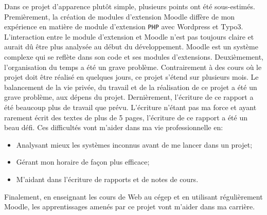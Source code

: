 \begin{conclusion}
Dans ce projet d'apparence plut\^ot simple, plusieurs points ont \'et\'e sous-estim\'es.
Premi\`erement, la cr\'eation de modules d'extension Moodle diff\`ere de mon exp\'erience en mati\`ere de module d'extension \texttt{PHP} avec Wordpress et Typo3.
L'interaction entre le module d'extension et Moodle n'est pas toujours claire et aurait d\^u \^etre plus analys\'ee au d\'ebut du d\'eveloppement.
Moodle est un syst\`eme complexe qui se refl\`ete dans son code et ses modules d'extensions.
Deuxi\`emement, l'organisation du temps a \'et\'e un grave probl\`eme.
Contrairement \`a des cours o\`u le projet doit \^etre r\'ealis\'e en quelques jours, ce projet s'\'etend sur plusieurs mois.
Le balancement de la vie priv\'ee, du travail et de la r\'ealisation de ce projet a \'et\'e un grave probl\`eme, aux d\'epens du projet.
Derni\`erement, l'\'ecriture de ce rapport a \'et\'e beaucoup plus de travail que pr\'evu.
L'\'ecriture n'\'etant pas ma force et ayant rarement \'ecrit des textes de plus de 5 pages, l'\'ecriture de ce rapport a \'et\'e un beau d\'efi.
Ces difficult\'es vont m'aider dans ma vie professionnelle en:
\begin{itemize}
  \item Analysant mieux les syst\`emes inconnus avant de me lancer dans un projet;
  \item G\'erant mon horaire de fa\c{c}on plus efficace;
  \item M'aidant dans l'\'ecriture de rapports et de notes de cours.
\end{itemize}
Finalement, en enseignant les cours de Web au c\'egep et en utilisant r\'eguli\`erement Moodle, les apprentissages amen\'es par ce projet vont m'aider dans ma carri\`ere.
\end{conclusion}
